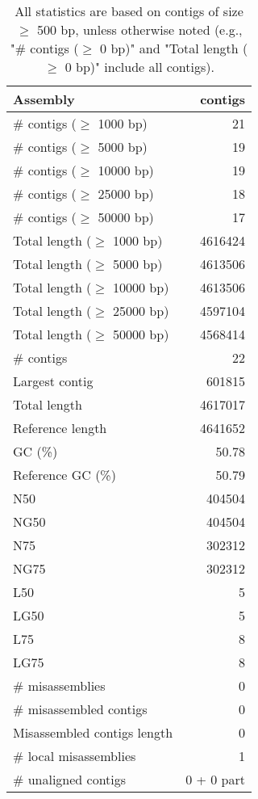 \documentclass[12pt,a4paper]{article}
\begin{document}
\begin{table}[ht]
\begin{center}
\caption{All statistics are based on contigs of size $\geq$ 500 bp, unless otherwise noted (e.g., "\# contigs ($\geq$ 0 bp)" and "Total length ($\geq$ 0 bp)" include all contigs).}
\begin{tabular}{|l*{1}{|r}|}
\hline
Assembly & contigs \\ \hline
\# contigs ($\geq$ 1000 bp) & 21 \\ \hline
\# contigs ($\geq$ 5000 bp) & 19 \\ \hline
\# contigs ($\geq$ 10000 bp) & 19 \\ \hline
\# contigs ($\geq$ 25000 bp) & 18 \\ \hline
\# contigs ($\geq$ 50000 bp) & 17 \\ \hline
Total length ($\geq$ 1000 bp) & 4616424 \\ \hline
Total length ($\geq$ 5000 bp) & 4613506 \\ \hline
Total length ($\geq$ 10000 bp) & 4613506 \\ \hline
Total length ($\geq$ 25000 bp) & 4597104 \\ \hline
Total length ($\geq$ 50000 bp) & 4568414 \\ \hline
\# contigs & 22 \\ \hline
Largest contig & 601815 \\ \hline
Total length & 4617017 \\ \hline
Reference length & 4641652 \\ \hline
GC (\%) & 50.78 \\ \hline
Reference GC (\%) & 50.79 \\ \hline
N50 & 404504 \\ \hline
NG50 & 404504 \\ \hline
N75 & 302312 \\ \hline
NG75 & 302312 \\ \hline
L50 & 5 \\ \hline
LG50 & 5 \\ \hline
L75 & 8 \\ \hline
LG75 & 8 \\ \hline
\# misassemblies & 0 \\ \hline
\# misassembled contigs & 0 \\ \hline
Misassembled contigs length & 0 \\ \hline
\# local misassemblies & 1 \\ \hline
\# unaligned contigs & 0 + 0 part \\ \hline

\end{tabular}
\end{center}
\end{table}
\end{document}
